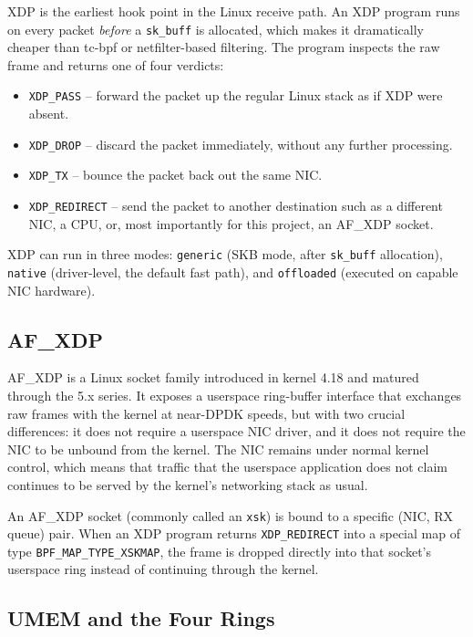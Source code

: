 \documentclass[10pt, letterpaper, twocolumn]{article}
\begin{document}
XDP is the earliest hook point in the Linux receive path. An XDP program runs on every packet \textit{before} a \texttt{sk\_buff} is allocated, which makes it dramatically cheaper than tc-bpf or netfilter-based filtering. The program inspects the raw frame and returns one of four verdicts:
\begin{itemize}
    \item \texttt{XDP\_PASS} -- forward the packet up the regular Linux stack as if XDP were absent.
    \item \texttt{XDP\_DROP} -- discard the packet immediately, without any further processing.
    \item \texttt{XDP\_TX} -- bounce the packet back out the same NIC.
    \item \texttt{XDP\_REDIRECT} -- send the packet to another destination such as a different NIC, a CPU, or, most importantly for this project, an AF\_XDP socket.
\end{itemize}
XDP can run in three modes: \texttt{generic} (SKB mode, after \texttt{sk\_buff} allocation), \texttt{native} (driver-level, the default fast path), and \texttt{offloaded} (executed on capable NIC hardware).

\subsection{AF\_XDP}

AF\_XDP is a Linux socket family introduced in kernel 4.18 and matured through the 5.x series. It exposes a userspace ring-buffer interface that exchanges raw frames with the kernel at near-DPDK speeds, but with two crucial differences: it does not require a userspace NIC driver, and it does not require the NIC to be unbound from the kernel. The NIC remains under normal kernel control, which means that traffic that the userspace application does not claim continues to be served by the kernel's networking stack as usual.

An AF\_XDP socket (commonly called an \texttt{xsk}) is bound to a specific (NIC, RX queue) pair. When an XDP program returns \texttt{XDP\_REDIRECT} into a special map of type \texttt{BPF\_MAP\_TYPE\_XSKMAP}, the frame is dropped directly into that socket's userspace ring instead of continuing through the kernel.

\subsection{UMEM and the Four Rings}
\end{document}
